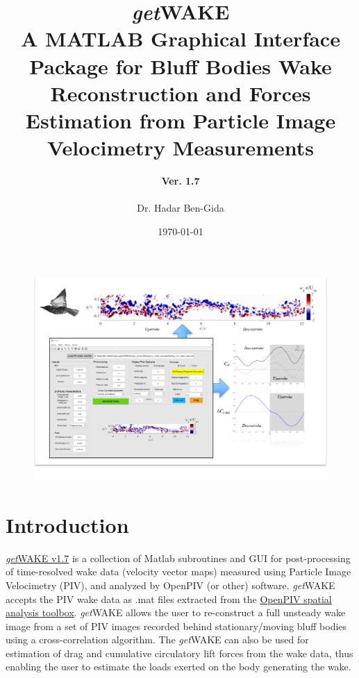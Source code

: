 \documentclass[12pt,a4paper]{article}
\title{\textbf{{\Huge \textit{get}WAKE} \\ A MATLAB Graphical Interface Package for Bluff Bodies Wake Reconstruction and Forces Estimation from Particle Image Velocimetry Measurements \newline {} \newline {\Huge User's Manual}}}
\author{
	\textbf{Ver. 1.7}\\
	\\
	Dr. Hadar Ben-Gida
}
\date{\today}
\begin{document}
\ifpdf
\graphicspath{{./Images/}}
\fi

\maketitle
\thispagestyle{empty}

\vspace{2mm} %

\begin{figure}[ht!]
	\centering
	\includegraphics[width=\textwidth]{getWAKE-Overview}
	\label{fig:getWAKE-Overview}
\end{figure}	

\newpage

\tableofcontents

\newpage


\section{Introduction}\label{Intro}

\href{https://github.com/OpenPIV/getWAKE}{\textit{get}WAKE v1.7} is a collection of Matlab subroutines and GUI for post-processing of time-resolved wake data (velocity vector maps) measured using Particle Image Velocimetry (PIV), and analyzed by OpenPIV (or other) software. 
\textit{get}WAKE accepts the PIV wake data as .mat files extracted from the \href{https://github.com/OpenPIV/openpiv-spatial-analysis-toolbox}{OpenPIV spatial analysis toolbox}.
\textit{get}WAKE allows the user to re-construct a full unsteady wake image from a set of PIV images recorded behind stationary/moving bluff bodies using a cross-correlation algorithm.
The \textit{get}WAKE can also be used for estimation of drag and cumulative circulatory lift forces from the wake data, thus enabling the user to estimate the loads exerted on the body generating the wake. 
\end{document}
